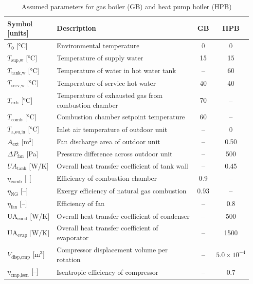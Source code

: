 \documentclass[final,5p,times,twocolumn,authoryear]{elsarticle}
\begin{document}
\begin{table}[htbp]
\centering
\caption{Assumed parameters for gas boiler (GB) and heat pump boiler (HPB)}
\label{tab:system_parameters}
\renewcommand{\arraystretch}{1.2}
\small
\begin{tabularx}{\columnwidth}{l X c c}
\toprule
\textbf{Symbol [units]} & \textbf{Description} & \textbf{GB} & \textbf{HPB} \\
\midrule
$T_0$ [°C] & Environmental temperature & 0 & 0 \\
$T_{\text{sup,w}}$ [°C] & Temperature of supply water & 15 & 15 \\
$T_{\text{tank,w}}$ [°C] & Temperature of water in hot water tank & -- & 60 \\
$T_{\text{serv,w}}$ [°C] & Temperature of service hot water & 40 & 40 \\
$T_{\text{exh}}$ [°C] & Temperature of exhausted gas from combustion chamber & 70 & -- \\
$T_{\text{comb}}$ [°C] & Combustion chamber setpoint temperature & 60 & -- \\
$T_{\text{a,ou,in}}$ [°C] & Inlet air temperature of outdoor unit & -- & 0 \\
$A_{\text{ext}}$ [m$^2$] & Fan discharge area of outdoor unit & -- & 0.50 \\
$\Delta P_{\text{fan}}$ [Pa] & Pressure difference across outdoor unit & -- & 500 \\
$UA_{\text{tank}}$ [W/K] & Overall heat transfer coefficient of tank wall & -- & 0.45 \\
$\eta_{\text{comb}}$ [--] & Efficiency of combustion chamber & 0.9 & -- \\
$\eta_{\text{NG}}$ [--] & Exergy efficiency of natural gas combustion & 0.93 & -- \\
$\eta_{\text{fan}}$ [--] & Efficiency of fan & -- & 0.8 \\
$\text{UA}_{\text{cond}}$ [W/K] & Overall heat transfer coefficient of condenser & -- & 500 \\
$\text{UA}_{\text{evap}}$ [W/K] & Overall heat transfer coefficient of evaporator & -- & 1500 \\
$V_{\text{disp,cmp}}$ [m$^3$] & Compressor displacement volume per rotation& -- & $5.0 \times 10^{-4}$ \\
$\eta_{\text{cmp,isen}}$ [--] & Isentropic efficiency of compressor & -- & 0.7 \\
\bottomrule
\end{tabularx}
\end{table}
\end{document}
